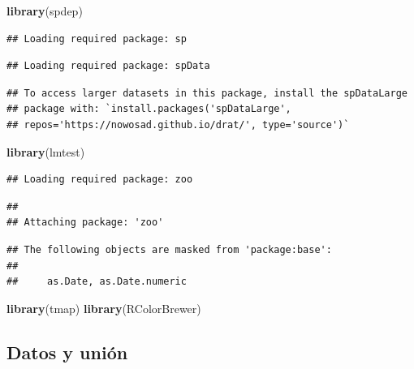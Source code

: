 \documentclass[11pt,]{article}
\newenvironment{Shaded}{\begin{snugshade}}{\end{snugshade}}
\newcommand{\KeywordTok}[1]{\textcolor[rgb]{0.13,0.29,0.53}{\textbf{#1}}}
\newcommand{\NormalTok}[1]{#1}
\begin{document}
\begin{Shaded}
\begin{Highlighting}[]
\KeywordTok{library}\NormalTok{(spdep)}
\end{Highlighting}
\end{Shaded}

\begin{verbatim}
## Loading required package: sp
\end{verbatim}

\begin{verbatim}
## Loading required package: spData
\end{verbatim}

\begin{verbatim}
## To access larger datasets in this package, install the spDataLarge
## package with: `install.packages('spDataLarge',
## repos='https://nowosad.github.io/drat/', type='source')`
\end{verbatim}

\begin{Shaded}
\begin{Highlighting}[]
\KeywordTok{library}\NormalTok{(lmtest)}
\end{Highlighting}
\end{Shaded}

\begin{verbatim}
## Loading required package: zoo
\end{verbatim}

\begin{verbatim}
## 
## Attaching package: 'zoo'
\end{verbatim}

\begin{verbatim}
## The following objects are masked from 'package:base':
## 
##     as.Date, as.Date.numeric
\end{verbatim}

\begin{Shaded}
\begin{Highlighting}[]
\KeywordTok{library}\NormalTok{(tmap)}
\KeywordTok{library}\NormalTok{(RColorBrewer)}
\end{Highlighting}
\end{Shaded}

\subsection{Datos y unión}\label{datos-y-uniuxf3n}
\end{document}
